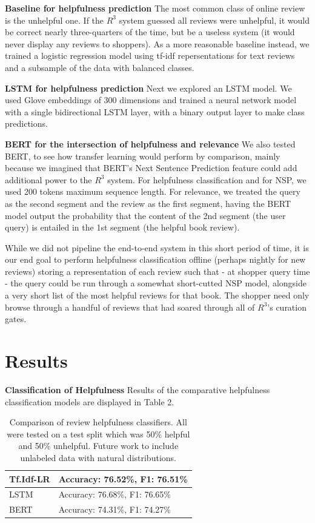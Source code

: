 \documentclass[10pt, a4paper, twocolumn]{article}
\begin{document}
\textbf{Baseline for helpfulness prediction}
The most common class of online review is the unhelpful one. If the $R^3$ system guessed all reviews were unhelpful, it would be correct nearly three-quarters of the time, but be a useless system (it would never display any reviews to shoppers). As a more reasonable baseline instead, we trained a logistic regression model using tf-idf repersentations for text reviews and a subsample of the data with balanced classes.

\textbf{LSTM for helpfulness prediction}
Next we explored an LSTM model. We used Glove embeddings of 300 dimensions and trained a neural network model with a single bidirectional LSTM layer, with a binary output layer to make class predictions.

\textbf{BERT for the intersection of helpfulness and relevance}
We also tested BERT\cite{devlin2018bert}, to see how transfer learning would perform by comparison, mainly because we imagined that BERT's Next Sentence Prediction feature could add additional power to the $R^3$ system. For helpfulness classification and for NSP, we used 200 tokens maximum sequence length. For relevance, we treated the query as the second segment and the review as the first segment, having the BERT model output the probability that the content of the 2nd segment (the user query) is entailed in the 1st segment (the helpful book review).

While we did not pipeline the end-to-end system in this short period of time, it is our end goal to perform helpfulness classification offline (perhaps nightly for new reviews) storing a representation of each review such that - at shopper query time - the query could be run through a somewhat short-cutted NSP model, alongside a very short list of the most helpful reviews for that book. The shopper need only browse through a handful of reviews that had soared through all of $R^3$'s curation gates.

\section{Results}
\textbf{Classification of Helpfulness}
Results of the comparative helpfulness classification models are displayed in Table 2.

\begin{table}
\begin{tabular}{ | p{3cm} | p{3cm}| }
  \hline
  Tf.Idf-LR & Accuracy: 76.52\%, F1: 76.51\% \\
  \hline
  LSTM & Accuracy: 76.68\%, F1: 76.65\% \\
    \hline
  BERT & Accuracy: 74.31\%, F1: 74.27\% \\
  \hline
\end{tabular}
\caption{Comparison of review helpfulness classifiers. All were tested on a test split which was 50\% helpful and 50\% unhelpful. Future work to include unlabeled data with natural distributions.}
\end{table}
\end{document}
